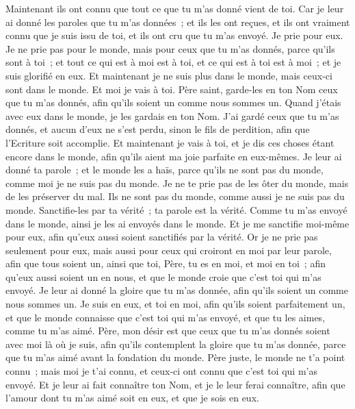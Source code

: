 \begin{multicols}{2}
Maintenant ils ont connu que tout ce que tu m'as donné vient de toi.
Car je leur ai donné les paroles que tu m'as données~; et ils les ont reçues, et ils ont vraiment connu que je suis issu de toi, et ils ont cru que tu m'as envoyé.
Je prie pour eux. Je ne prie pas pour le monde, mais pour ceux que tu m'as donnés, parce qu'ils sont à toi~;
et tout ce qui est à moi est à toi, et ce qui est à toi est à moi~; et je suis glorifié en eux.
Et maintenant je ne suis plus dans le monde, mais ceux-ci sont dans le monde. Et moi je vais à toi. Père saint, garde-les en ton Nom ceux que tu m'as donnés, afin qu'ils soient un comme nous sommes un.
Quand j'étais avec eux dans le monde, je les gardais en ton Nom. J'ai gardé ceux que tu m'as donnés, et aucun d'eux ne s'est perdu, sinon le fils de perdition, afin que l'Ecriture soit accomplie.
Et maintenant je vais à toi, et je dis ces choses étant encore dans le monde, afin qu'ils aient ma joie parfaite en eux-mêmes.
Je leur ai donné ta parole~; et le monde les a haïs, parce qu'ils ne sont pas du monde, comme moi je ne suis pas du monde.
Je ne te prie pas de les ôter du monde, mais de les préserver du mal.
Ils ne sont pas du monde, comme aussi je ne suis pas du monde.
Sanctifie-les par ta vérité~; ta parole est la vérité.
Comme tu m'as envoyé dans le monde, ainsi je les ai envoyés dans le monde.
Et je me sanctifie moi-même pour eux, afin qu'eux aussi soient sanctifiés par la vérité.
Or je ne prie pas seulement pour eux, mais aussi pour ceux qui croiront en moi par leur parole,
afin que tous soient un, ainsi que toi, Père, tu es en moi, et moi en toi~; afin qu'eux aussi soient un en nous, et que le monde croie que c'est toi qui m'as envoyé.
Je leur ai donné la gloire que tu m'as donnée, afin qu'ils soient un comme nous sommes un.
Je suis en eux, et toi en moi, afin qu'ils soient parfaitement un, et que le monde connaisse que c'est toi qui m'as envoyé, et que tu les aimes, comme tu m'as aimé.
Père, mon désir est que ceux que tu m'as donnés soient avec moi là où je suis, afin qu'ils contemplent la gloire que tu m'as donnée, parce que tu m'as aimé avant la fondation du monde.
Père juste, le monde ne t'a point connu~; mais moi je t'ai connu, et ceux-ci ont connu que c'est toi qui m'as envoyé.
Et je leur ai fait connaître ton Nom, et je le leur ferai connaître, afin que l'amour dont tu m'as aimé soit en eux, et que je sois en eux.

\end{multicols}
